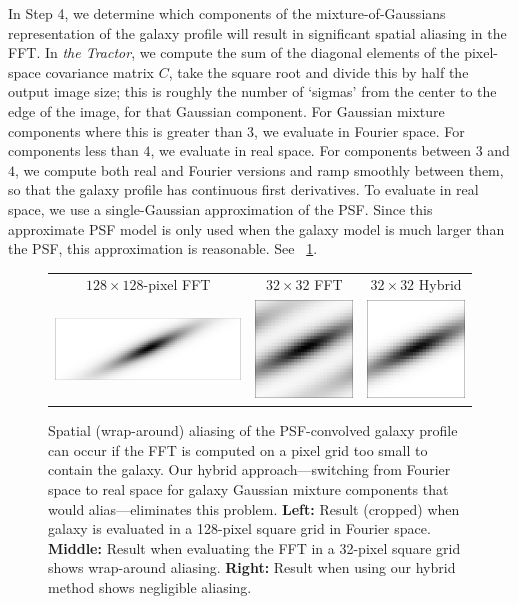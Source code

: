 \documentclass[11pt,preprint]{aastex}
\newcommand{\figref}[1]{\figurename~\ref{#1}}
\newcommand{\project}[1]{\textsl{#1}}
\begin{document}
In Step 4, we determine which components of the mixture-of-Gaussians
representation of the galaxy profile will result in significant
spatial aliasing in the FFT.  In \project{the Tractor}, we compute the
sum of the diagonal elements of the pixel-space covariance matrix $C$,
take the square root and divide this by half the output image size;
this is roughly the number of `sigmas' from the center to the edge of
the image, for that Gaussian component.  For Gaussian mixture
components where this is greater than $3$, we evaluate in Fourier
space.  For components less than $4$, we evaluate in real space.  For
components between $3$ and $4$, we compute both real and Fourier
versions and ramp smoothly between them, so that the galaxy profile
has continuous first derivatives.  To evaluate in real space, we use a
single-Gaussian approximation of the PSF.  Since this approximate PSF
model is only used when the galaxy model is much larger than the PSF,
this approximation is reasonable.  See \figref{fig:wrap}.


\begin{figure}[htb]
\begin{center}
\begin{tabular}{@{}ccc@{}}
  $128 \times 128$-pixel FFT &
  $32 \times 32$ FFT &
  $32 \times 32$ Hybrid \\
  \includegraphics[height=0.19\textwidth]{gal-00} &
  \includegraphics[height=0.19\textwidth]{gal-01} &
  \includegraphics[height=0.19\textwidth]{gal-02} \\
\end{tabular}
\end{center}
\caption{\label{fig:wrap}%
  Spatial (wrap-around) aliasing of the PSF-convolved galaxy profile
  can occur if the FFT is
  computed on a pixel grid too small to contain the galaxy.
  Our hybrid approach---switching from Fourier space to real space
  for galaxy Gaussian mixture components that would alias---eliminates
  this problem.
  \textbf{Left:} Result (cropped) when galaxy is evaluated in a 128-pixel square grid in Fourier space.
  \textbf{Middle:} Result when evaluating the FFT in a 32-pixel square grid shows wrap-around
  aliasing.
  \textbf{Right:} Result when using our hybrid method shows negligible aliasing.
}
\end{figure}
\end{document}
